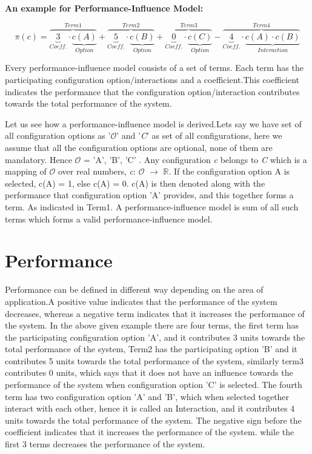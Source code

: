 \textbf{An example for Performance-Influence Model:}

\begin{equation*}
  \pi {(c)} = \overbrace{\underbrace {3}_{Coeff.} \cdot  \underbrace{{c(A)}}_{Option}}^{Term 1}  + \overbrace{ \underbrace{5}_{Coeff.} \cdot \underbrace{{c(B)}}_{Option}}^{Term 2} + \overbrace{\underbrace{0}_{Coeff.} \cdot \underbrace{{c(C)}}_{Option}}^{Term 3} - \overbrace{\underbrace{4}_{Coeff.} \cdot \underbrace{{ c(A)} \cdot {c(B)}}_{Interaction}}^{Term 4}
  \tag{2.1}\label{eq:2.1}
\end{equation*}


Every performance-influence model consists of a set of terms. Each term has the participating configuration option/interactions and a coefficient.This coefficient indicates the performance that the configuration option/interaction contributes towards the total performance of the system.

Let us see how a performance-influence model is derived.Lets say we have set of all configuration options as '$\mathcal{O}$' and '\textit{C}' as set of all configurations, here we assume that all the configuration options are optional, none of them are mandatory. Hence $\mathcal{O}$ = \textbraceleft 'A', 'B', 'C' \textbraceright. Any configuration \textit{c} belongs to \textit{C} which is a mapping of $\mathcal{O}$ over real numbers, \textit{c}: $\mathcal{O}$ $\rightarrow$ $\mathbb{R}$. If the configuration option A is selected, c(A) = 1, else c(A) = 0. c(A) is then denoted along with the performance that configuration option 'A' provides, and this together forms a term. As indicated in Term1. A performance-influence model is sum of all such terms which forms a valid performance-influence model.

\section{Performance}
Performance can be defined in different way depending on the area of application.A positive value indicates that the performance of the system decreases, whereas a negative term indicates that it increases the performance of the system. In the above given example there are four terms, the first term has the participating configuration option 'A', and it contributes 3 units towards the total performance of the system, Term2 has the participating option 'B' and it contributes 5 units towards the total performance of the system, similarly term3 contributes 0 units, which says that it does not have an influence towards the performance of the system when configuration option 'C' is selected. The fourth term has two configuration option 'A' and 'B', which when selected together interact with each other, hence it is called an Interaction, and it contributes 4 units towards the total performance of the system. The negative sign before the coefficient indicates that it increases the performance of the system. while the first 3 terms decreases the performance of the system.

